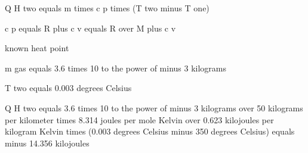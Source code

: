 Q H two equals m times c p times (T two minus T one)

c p equals R plus c v equals R over M plus c v

known heat point

m gas equals 3.6 times 10 to the power of minus 3 kilograms

T two equals 0.003 degrees Celsius

Q H two equals 3.6 times 10 to the power of minus 3 kilograms over 50 kilograms per kilometer times 8.314 joules per mole Kelvin over 0.623 kilojoules per kilogram Kelvin times (0.003 degrees Celsius minus 350 degrees Celsius) equals minus 14.356 kilojoules